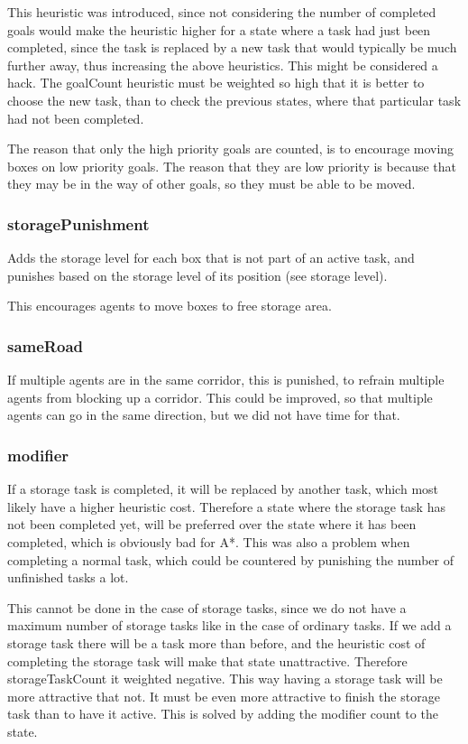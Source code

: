 \documentclass[letterpaper]{article}
\begin{document}
This heuristic was introduced, since not considering the number of completed goals
would make the heuristic higher for a state where a task had just been completed,
since the task is replaced by a new task that would typically be much further away,
thus increasing the above heuristics. This might be considered a hack. The goalCount
heuristic must be weighted so high that it is better to choose the new task, than to
check the previous states, where that particular task had not been completed.

The reason that only the high priority goals are counted, is to encourage moving
boxes on low priority goals. The reason that they are low priority is because that
they may be in the way of other goals, so they must be able to be moved.

\subsubsection{storagePunishment}
Adds the storage level for each box that is not part of an active task, and
punishes based on the storage level of its position (see storage level).

This encourages agents to move boxes to free storage area.

\subsubsection{sameRoad}
If multiple agents are in the same corridor, this is punished, to refrain multiple
agents from blocking up a corridor. This could be improved, so that multiple agents
can go in the same direction, but we did not have time for that.

\subsubsection{modifier}
If a storage task is completed, it will be replaced by another task, which most likely
have a higher heuristic cost. Therefore a state where the storage task has not been completed
yet, will be preferred over the state where it has been completed, which is obviously bad
for A*. This was also a problem when completing a normal task, which could be countered
by punishing the number of unfinished tasks a lot.

This cannot be done in the case of storage tasks, since we do not have a maximum number of
storage tasks like in the case of ordinary tasks. If we add a storage task there will be
a task more than before, and the heuristic cost of completing the storage task will make that
state unattractive. Therefore storageTaskCount it weighted negative. This way having a storage
task will be more attractive that not. It must be even more attractive to finish the storage
task than to have it active. This is solved by adding the modifier count to the state.
\end{document}
